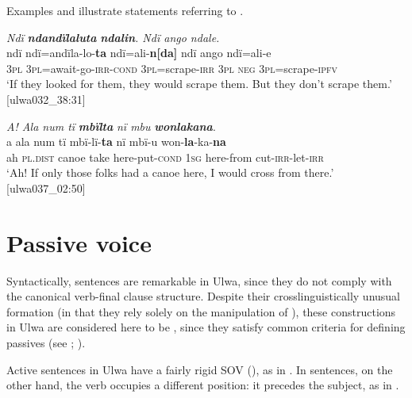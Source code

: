 Examples  and  illustrate   statements referring to  .


\ea%
    \label{ex:syntax:270}
          \textit{Ndï} \textbf{\textit{ndandïlaluta}} \textbf{\textit{ndalin}}\textit{. Ndï ango ndale.}\\
\gll    ndï  ndï=andïla-lo-\textbf{ta}      ndï=ali-\textbf{n[da]}    ndï    ango ndï=ali{}-e\\
    3\textsc{pl}  \textsc{3pl=}await-go-\textsc{irr-cond}  3\textsc{pl}=scrape-\textsc{irr}  \textsc{3pl}    \textsc{neg}    \textsc{3pl}=scrape-\textsc{ipfv}\\
\glt `If they looked for them, they would scrape them. But they don’t scrape them.’ [ulwa032\_38:31]
\z

\ea%
    \label{ex:syntax:271}
          \textit{A! Ala num tï} \textbf{\textit{mbïlta}} \textit{nï mbu} \textbf{\textit{wonlakana}}.\\
\gll a  ala      num  tï    mbï-lï{}-\textbf{ta}      nï    mbï-u won-\textbf{la}{}-ka-\textbf{na}\\
    ah  \textsc{pl.dist}  canoe  take  here-put-\textsc{cond}  \textsc{1sg}  here-from    cut-\textsc{irr}{}-let-\textsc{irr}\\
\glt `Ah! If only those folks had a canoe here, I would cross from there.’ [ulwa037\_02:50]
\z

\newpage

\section{Passive voice}\label{sec:13.7}


Syntactically,  sentences are remarkable in Ulwa, since they do not comply with the canonical verb-final clause structure. Despite their crosslinguistically unusual formation (in that they rely solely on the manipulation of ), these constructions in Ulwa are considered here to be , since they satisfy common criteria for defining passives (see \cite{Siewierska2013}; \cite{Barlow2019a}).

   Active sentences in Ulwa have a fairly rigid SOV  (), as in . In  sentences, on the other hand, the verb occupies a different position: it precedes the subject, as in .


